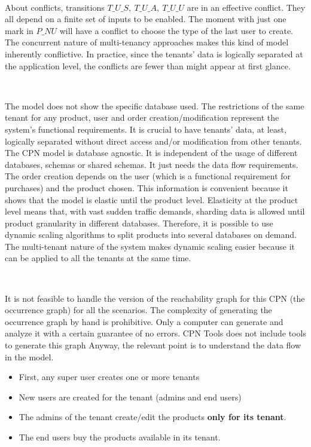 \documentclass[12pt,english]{article} %
\begin{document}
\

About conflicts, transitions $T\_U\_S,\ T\_U\_A,\ T\_U\_U$ are in an effective conflict.
They all depend on a finite set of inputs to be enabled.
The moment with just one mark in $P\_NU$ will have a conflict to choose the type of the last user to create.
The concurrent nature of multi-tenancy approaches makes this kind of model inherently conflictive.
In practice, since the tenants' data is logically separated at the application level, the conflicts are fewer than might appear at first glance.

\

The model does not show the specific database used.
The restrictions of the same tenant for any product, user and order creation/modification represent the system's functional requirements.
It is crucial to have tenants' data, at least, logically separated without direct access and/or modification from other tenants.
The CPN model is database agnostic.
It is independent of the usage of different databases, schemas or shared schemas.
It just needs the data flow requirements.
The order creation depends on the user (which is a functional requirement for purchases) and the product chosen.
This information is convenient because it shows that the model is elastic until the product level.
Elasticity at the product level means that, with vast sudden traffic demands, sharding data is allowed until product granularity in different databases.
Therefore, it is possible to use dynamic scaling algorithms to split products into several databases on demand.
The multi-tenant nature of the system makes dynamic scaling easier because it can be applied to all the tenants at the same time.

\

It is not feasible to handle the version of the reachability graph for this CPN (the occurrence graph) for all the scenarios.
The complexity of generating the occurrence graph by hand is prohibitive.
Only a computer can generate and analyze it with a certain guarantee of no errors.
CPN Tools does not include tools to generate this graph
Anyway, the relevant point is to understand the data flow in the model.

\begin{itemize}
    \item First, any super user creates one or more tenants
    \item New users are created for the tenant (admins and end users)
    \item The admins of the tenant create/edit the products \textbf{only for its tenant}.
    \item The end users buy the products available in its tenant.
\end{itemize}
\end{document}
